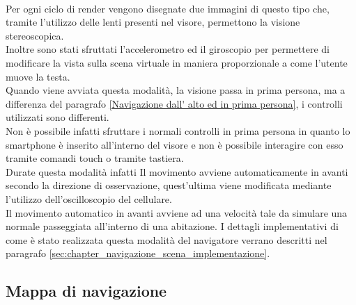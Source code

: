 \\
Per ogni ciclo di render vengono disegnate due immagini di questo tipo che, tramite l’utilizzo delle lenti presenti nel visore, permettono la visione stereoscopica.
\\
Inoltre sono stati sfruttati l’accelerometro ed il giroscopio per permettere di modificare la vista sulla scena virtuale in maniera proporzionale a come l’utente muove la testa.
\\
Quando viene avviata questa modalità, la visione passa in prima persona, ma a differenza del paragrafo \ref{Navigazione dall' alto ed in prima persona}, i controlli utilizzati sono differenti.
\\
Non è possibile infatti sfruttare i normali controlli in prima persona in quanto lo smartphone è inserito all’interno del visore e non è possibile interagire con esso tramite comandi touch o tramite tastiera.
\\
Durate questa modalità infatti Il movimento avviene automaticamente in avanti secondo la direzione di osservazione, quest’ultima viene modificata mediante l’utilizzo dell’oscilloscopio del cellulare.
\\
Il movimento automatico in avanti avviene ad una velocità tale da simulare una normale passeggiata all’interno di una abitazione.
I dettagli implementativi di come è stato realizzata questa modalità del navigatore verrano descritti nel paragrafo \ref{sec:chapter_navigazione_scena_implementazione}.

\subsection{Mappa di navigazione}
\label{sec:caratteristiche_navigatore_mappa}


